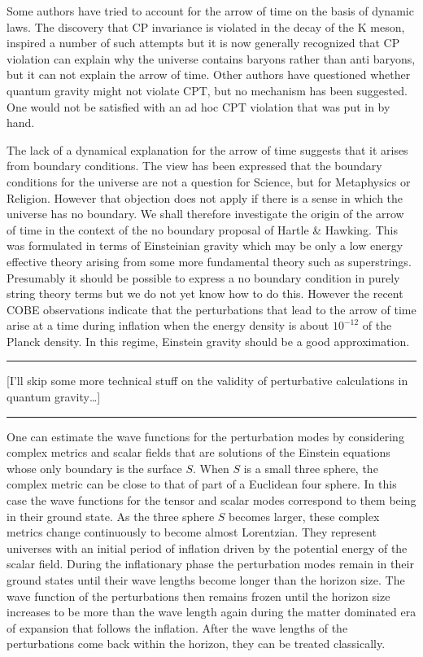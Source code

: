 \documentclass{article}
\begin{document}
Some authors have tried to account for the arrow of time on the basis of
dynamic laws. The discovery that CP invariance is violated in the decay
of the K meson, inspired a number of such attempts but it is now
generally recognized that CP violation can explain why the universe
contains baryons rather than anti baryons, but it can not explain the
arrow of time. Other authors have questioned whether quantum gravity
might not violate CPT, but no mechanism has been suggested. One would
not be satisfied with an ad hoc CPT violation that was put in by hand.

The lack of a dynamical explanation for the arrow of time suggests that
it arises from boundary conditions. The view has been expressed that the
boundary conditions for the universe are not a question for Science, but
for Metaphysics or Religion. However that objection does not apply if
there is a sense in which the universe has no boundary. We shall
therefore investigate the origin of the arrow of time in the context of
the no boundary proposal of Hartle \& Hawking. This was formulated in
terms of Einsteinian gravity which may be only a low energy effective
theory arising from some more fundamental theory such as superstrings.
Presumably it should be possible to express a no boundary condition in
purely string theory terms but we do not yet know how to do this.
However the recent COBE observations indicate that the perturbations
that lead to the arrow of time arise at a time during inflation when the
energy density is about \(10^{-12}\) of the Planck density. In this
regime, Einstein gravity should be a good approximation.

\begin{center}\rule{0.5\linewidth}{0.5pt}\end{center}

{[}I'll skip some more technical stuff on the validity of perturbative
calculations in quantum gravity\ldots{]}

\begin{center}\rule{0.5\linewidth}{0.5pt}\end{center}

One can estimate the wave functions for the perturbation modes by
considering complex metrics and scalar fields that are solutions of the
Einstein equations whose only boundary is the surface \(S\). When \(S\)
is a small three sphere, the complex metric can be close to that of part
of a Euclidean four sphere. In this case the wave functions for the
tensor and scalar modes correspond to them being in their ground state.
As the three sphere \(S\) becomes larger, these complex metrics change
continuously to become almost Lorentzian. They represent universes with
an initial period of inflation driven by the potential energy of the
scalar field. During the inflationary phase the perturbation modes
remain in their ground states until their wave lengths become longer
than the horizon size. The wave function of the perturbations then
remains frozen until the horizon size increases to be more than the wave
length again during the matter dominated era of expansion that follows
the inflation. After the wave lengths of the perturbations come back
within the horizon, they can be treated classically.
\end{document}

